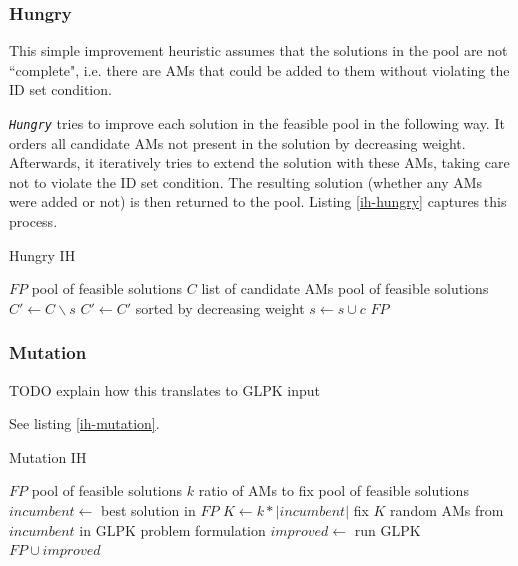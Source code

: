 \documentclass[a4paper,12pt,oneside]{report}
\newcommand{\heu}[1]{\texttt{\textit{#1}}}
\begin{document}
\subsubsection{Hungry}

This simple improvement heuristic assumes that the solutions in the pool are not ``complete", i.e. there are AMs that could be added to them without violating the ID set condition.

\heu{Hungry} tries to improve each solution in the feasible pool in the following way. It orders all candidate AMs not present in the solution by decreasing weight. Afterwards, it iteratively tries to extend the solution with these AMs, taking care not to violate the ID set condition. The resulting solution (whether any AMs were added or not) is then returned to the pool. Listing \ref{ih-hungry} captures this process.

\begin{algorithm}
\caption{Hungry IH}
\label{ih-hungry}
\begin{algorithmic}
\REQUIRE $FP$ pool of feasible solutions
\REQUIRE $C$ list of candidate AMs
\ENSURE pool of feasible solutions
  \STATE {}
  \STATE $C' \gets C \backslash s$
  \STATE $C' \gets C'$ sorted by decreasing weight
      \STATE $s \gets s \cup c$
    \ENDIF
  \ENDFOR
\ENDFOR
\RETURN $FP$
\end{algorithmic}
\end{algorithm}

\subsubsection{Mutation}

TODO explain how this translates to GLPK input

See listing \ref{ih-mutation}.

\begin{algorithm}
\caption{Mutation IH}
\label{ih-mutation}
\begin{algorithmic}
\REQUIRE $FP$ pool of feasible solutions
\REQUIRE $k$ ratio of AMs to fix
\ENSURE pool of feasible solutions
\STATE $incumbent \gets $ best solution in $FP$ 
\STATE $K \gets k * |incumbent|$
\STATE fix $K$ random AMs from $incumbent$ in GLPK problem formulation
\STATE $improved \gets $ run GLPK
\RETURN $FP \cup improved$
\end{algorithmic}
\end{algorithm}
\end{document}
